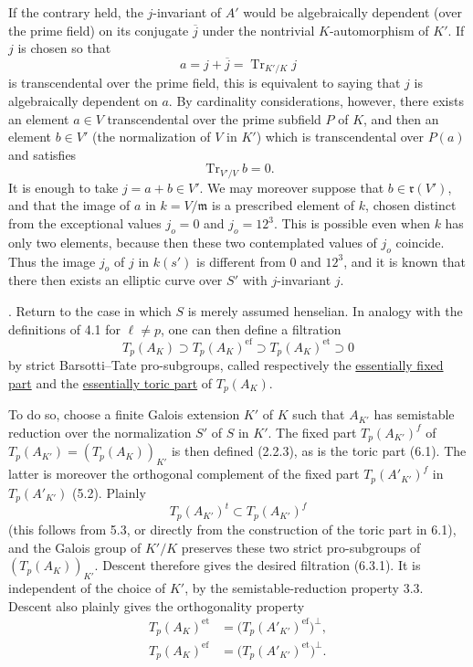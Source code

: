 If the contrary held, the $j$-invariant of $A'$ would be algebraically
dependent (over the prime field) on its conjugate $\overline j$ under
the nontrivial $K$-automorphism of $K'$.  If $j$ is chosen so that
\[
 a=j+\overline j=\operatorname{Tr}_{K'/K}j
\]
is transcendental over the prime field, this is equivalent to saying
that $j$ is algebraically dependent on $a$.  By cardinality
considerations, however, there exists an element $a\in V$
transcendental over the prime subfield $P$ of $K$, and then an element
$b\in V'$ (the normalization of $V$ in $K'$) which is transcendental
over $P(a)$ and satisfies
\[
 \operatorname{Tr}_{V'/V}b=0.
\]
It is enough to take $j=a+b\in V'$.  We may moreover suppose that
$b\in\mathfrak r(V')$, and that the image of $a$ in
$k=V/\mathfrak m$ is a prescribed element of $k$, chosen distinct from
the exceptional values $j_o=0$ and $j_o=12^3$.  This is possible even
when $k$ has only two elements, because then these two contemplated
values of $j_o$ coincide.  Thus the image $j_o$ of $j$ in $k(s')$ is
different from $0$ and $12^3$, and it is known that there then exists
an elliptic curve over $S'$ with $j$-invariant $j$.

\medskip
{}. Return to the case in which $S$ is merely assumed henselian.  In
analogy with the definitions of 4.1 for $\ell\neq p$, one can then
define a filtration
\begin{equation}\tag{6.3.1}
 T_p(A_K)\supset T_p(A_K)^{\mathrm{ef}}
 \supset T_p(A_K)^{\mathrm{et}}\supset0
\end{equation}
by strict Barsotti--Tate pro-subgroups, called respectively the
\underline{essentially fixed part} and the
\underline{essentially toric part} of $T_p(A_K)$.

To do so, choose a finite Galois extension $K'$ of $K$ such that
$A_{K'}$ has semistable reduction over the normalization $S'$ of $S$
in $K'$.  The fixed part $T_p(A_{K'})^f$ of
$T_p(A_{K'})=(T_p(A_K))_{K'}$ is then defined (2.2.3), as is the toric
part (6.1).  The latter is moreover the orthogonal complement of the
fixed part $T_p(A'_{K'})^f$ in $T_p(A'_{K'})$ (5.2).  Plainly
\[
 T_p(A_{K'})^t\subset T_p(A_{K'})^f
\]
(this follows from 5.3, or directly from the construction of the toric
part in 6.1), and the Galois group of $K'/K$ preserves these two strict
pro-subgroups of $(T_p(A_K))_{K'}$.  Descent therefore gives the desired
filtration (6.3.1).  It is independent of the choice of $K'$, by the
semistable-reduction property 3.3.  Descent also plainly gives the
orthogonality property
\begin{equation}\tag{6.3.2}
 \begin{split}
 T_p(A_K)^{\mathrm{et}}
   &=\bigl(T_p(A'_{K'})^{\mathrm{ef}}\bigr)^\perp,\\
 T_p(A_K)^{\mathrm{ef}}
   &=\bigl(T_p(A'_{K'})^{\mathrm{et}}\bigr)^\perp.
 \end{split}
\end{equation}


